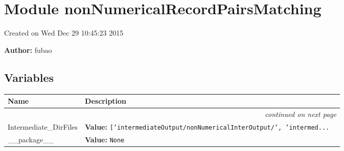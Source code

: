 %
%
%


\section{Module nonNumericalRecordPairsMatching}

    \label{nonNumericalRecordPairsMatching}
Created on Wed Dec 29 10:45:23 2015

\textbf{Author:} fubao





  \subsection{Variables}

    \vspace{-1cm}
\hspace{\varindent}\begin{longtable}{|p{\varnamewidth}|p{\vardescrwidth}|l}
\cline{1-2}
\cline{1-2} \centering \textbf{Name} & \centering \textbf{Description}& \\
\cline{1-2}
\endhead\cline{1-2}\multicolumn{3}{r}{\small\textit{continued on next page}}\\\endfoot\cline{1-2}
\endlastfoot\raggedright I\-n\-t\-e\-r\-m\-e\-d\-i\-a\-t\-e\-\_\-D\-i\-r\-F\-i\-l\-e\-s\- & \raggedright \textbf{Value:} 
{\tt \texttt{[}\texttt{'}\texttt{intermediateOutput/nonNumericalInterOutput/}\texttt{'}\texttt{, }\texttt{'}\texttt{intermed}\texttt{...}}&\\
\cline{1-2}
\raggedright \_\-\_\-p\-a\-c\-k\-a\-g\-e\-\_\-\_\- & \raggedright \textbf{Value:} 
{\tt None}&\\
\cline{1-2}
\end{longtable}



